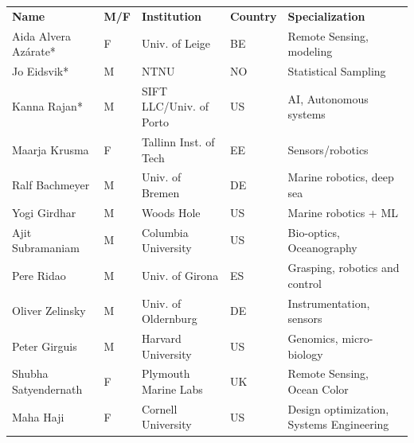 \begin{table}[H]
  \footnotesize{
\begin{tabular}{|p{3.5cm}|p{0.7cm}|p{4.0cm}|p{0.5cm}|p{6.0cm}|}
  \rowcolor{Gray}
  \bfseries Name& \bfseries M/F&\bfseries Institution & \bfseries Country& \bfseries Specialization\\
  Aida Alvera Az\'{a}rate*    & F   & Univ. of Leige                        & BE       & Remote Sensing, modeling                        \\
  \hline
  Jo Eidsvik*               & M   & NTNU                                  & NO       & Statistical Sampling                            \\
  \hline
  Kanna Rajan*              & M   & SIFT LLC/Univ. of Porto            & US       & AI, Autonomous systems           \\
  \hline
  Maarja Krusma            & F   & Tallinn Inst. of Tech                 & EE  & Sensors/robotics                                \\
  \hline
  Ralf Bachmeyer           & M   & Univ. of Bremen                       & DE       & Marine robotics, deep sea                       \\
  \hline
  Yogi Girdhar             & M   & Woods Hole                                  & US       & Marine robotics + ML                            \\
  \hline
  Ajit Subramaniam         & M   & Columbia University                        & US       & Bio-optics, Oceanography                        \\
  \hline
  Pere Ridao               & M   & Univ. of Girona& ES       & Grasping, robotics and control                            \\
  \hline
  Oliver Zelinsky          & M   & Univ. of Oldernburg                   & DE       & Instrumentation, sensors                        \\
  \hline
  Peter Girguis            & M   & Harvard University                               & US       & Genomics, micro-biology                         \\
  \hline
  Shubha Satyendernath     & F   & Plymouth Marine Labs                  & UK       & Remote Sensing, Ocean Color                     \\
  \hline
  Maha Haji                & F   & Cornell University                              & US       & Design optimization, Systems Engineering                   \\

\end{tabular}}
\end{table}

